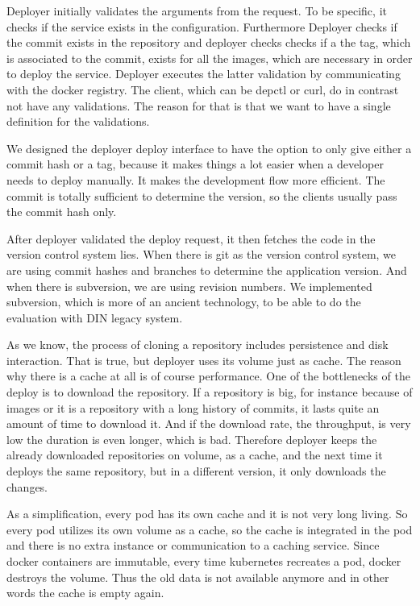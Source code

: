 Deployer initially validates the arguments from the request. To be specific, it checks if
the service exists in the configuration. Furthermore Deployer checks if the commit exists
in the repository and deployer checks checks if a the tag, which is associated to the
commit, exists for all the images, which are necessary in order to deploy the
service. Deployer executes the latter validation by communicating with the docker
registry. The client, which can be depctl or curl, do in contrast not have any
validations. The reason for that is that we want to have a single definition for the
validations.

We designed the deployer deploy interface to have the option to only give either a commit
hash or a tag, because it makes things a lot easier when a developer needs to deploy
manually. It makes the development flow more efficient. The commit is totally sufficient
to determine the version, so the clients usually pass the commit hash only.

After deployer validated the deploy request, it then fetches the code in the version
control system lies. When there is git as the version control system, we are using commit
hashes and branches to determine the application version. And when there is subversion, we
are using revision numbers. We implemented subversion, which is more of an ancient
technology, to be able to do the evaluation with DIN legacy system.

As we know, the process of cloning a repository includes persistence and disk
interaction. That is true, but deployer uses its volume just as cache. The reason why
there is a cache at all is of course performance. One of the bottlenecks of the deploy is
to download the repository. If a repository is big, for instance because of images or it
is a repository with a long history of commits, it lasts quite an amount of time to
download it. And if the download rate, the throughput, is very low the duration is even
longer, which is bad. Therefore deployer keeps the already downloaded repositories on
volume, as a cache, and the next time it deploys the same repository, but in a different
version, it only downloads the changes.

As a simplification, every pod has its own cache and it is not very long living. So every
pod utilizes its own volume as a cache, so the cache is integrated in the pod and there is
no extra instance or communication to a caching service. Since docker containers are
immutable, every time kubernetes recreates a pod, docker destroys the volume. Thus the old
data is not available anymore and in other words the cache is empty again.

